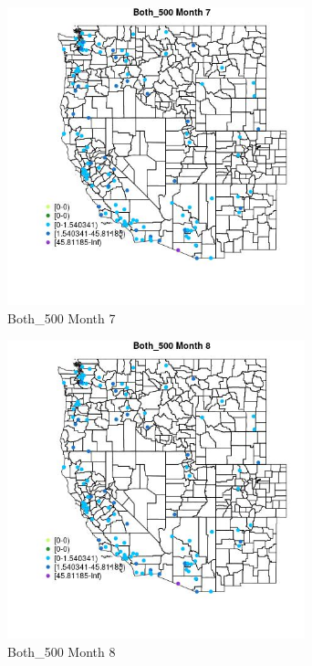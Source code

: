 \begin{figure} 
\centering  
\includegraphics[width=0.77\textwidth]{Code_Outputs/Report_ML_input_PM25_Step4_part_e_de_duplicated_aves_MapObsMo7Both_500.jpg} 
\caption{\label{fig:Report_ML_input_PM25_Step4_part_e_de_duplicated_avesMapObsMo7Both_500}Both_500 Month 7} 
\end{figure} 
 

\begin{figure} 
\centering  
\includegraphics[width=0.77\textwidth]{Code_Outputs/Report_ML_input_PM25_Step4_part_e_de_duplicated_aves_MapObsMo8Both_500.jpg} 
\caption{\label{fig:Report_ML_input_PM25_Step4_part_e_de_duplicated_avesMapObsMo8Both_500}Both_500 Month 8} 
\end{figure} 
 

